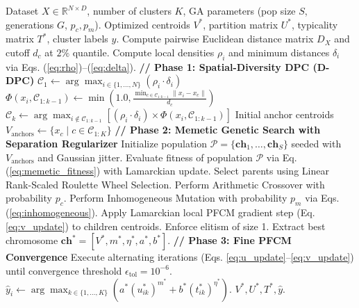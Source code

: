 \documentclass[preprint,12pt]{elsarticle}
\begin{document}
\begin{algorithm}[htbp]
\caption{The Proposed SD-MGA-PFCM Framework}
\label{alg:sd_mga_pfcm}
\begin{algorithmic}[1]
\Require Dataset $X \in \mathbb{R}^{N \times D}$, number of clusters $K$, GA parameters (pop size $S$, generations $G$, $p_c, p_m$).
\Ensure Optimized centroids $V^*$, partition matrix $U^*$, typicality matrix $T^*$, cluster labels $\hat{y}$.
\State Compute pairwise Euclidean distance matrix $D_X$ and cutoff $d_c$ at $2\%$ quantile.
\State Compute local densities $\rho_i$ and minimum distances $\delta_i$ via Eqs. (\ref{eq:rho})--(\ref{eq:delta}).
\State \textbf{// Phase 1: Spatial-Diversity DPC (D-DPC)}
\State $\mathcal{C}_1 \gets \arg\max_{i \in \{1,\dots,N\}} (\rho_i \cdot \delta_i)$
    \State $\Phi(x_i, \mathcal{C}_{1:k-1}) \gets \min\left(1.0, \frac{\min_{c \in \mathcal{C}_{1:k-1}} \|x_i - x_c\|}{d_c}\right)$
    \State $\mathcal{C}_k \gets \arg\max_{i \notin \mathcal{C}_{1:k-1}} \left[ (\rho_i \cdot \delta_i) \times \Phi(x_i, \mathcal{C}_{1:k-1}) \right]$
\EndFor
\State Initial anchor centroids $V_{\text{anchors}} \gets \{x_{c} \mid c \in \mathcal{C}_{1:K}\}$
\State \textbf{// Phase 2: Memetic Genetic Search with Separation Regularizer}
\State Initialize population $\mathcal{P} = \{\mathbf{ch}_1, \dots, \mathbf{ch}_S\}$ seeded with $V_{\text{anchors}}$ and Gaussian jitter.
    \State Evaluate fitness of population $\mathcal{P}$ via Eq. (\ref{eq:memetic_fitness}) with Lamarckian update.
    \State Select parents using Linear Rank-Scaled Roulette Wheel Selection.
    \State Perform Arithmetic Crossover with probability $p_c$.
    \State Perform Inhomogeneous Mutation with probability $p_m$ via Eqs. (\ref{eq:inhomogeneous}).
    \State Apply Lamarckian local PFCM gradient step (Eq. \ref{eq:v_update}) to children centroids.
    \State Enforce elitism of size 1.
\EndFor
\State Extract best chromosome $\mathbf{ch}^* = [V^*, m^*, \eta^*, a^*, b^*]$.
\State \textbf{// Phase 3: Fine PFCM Convergence}
\State Execute alternating iterations (Eqs. \ref{eq:u_update}--\ref{eq:v_update}) until convergence threshold $\epsilon_{\text{tol}} = 10^{-6}$.
\State $\hat{y}_i \gets \arg\max_{k \in \{1,\dots,K\}} (a^* (u_{ik}^*)^{m^*} + b^* (t_{ik}^*)^{\eta^*})$.
\State \Return $V^*, U^*, T^*, \hat{y}$.
\end{algorithmic}
\end{algorithm}
\end{document}

